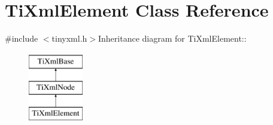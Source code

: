 \hypertarget{class_ti_xml_element}{
\section{TiXmlElement Class Reference}
\label{class_ti_xml_element}
}


{\ttfamily \#include $<$tinyxml.h$>$}Inheritance diagram for TiXmlElement::\begin{figure}[H]
\begin{center}
\leavevmode
\includegraphics[height=3cm]{class_ti_xml_element}
\end{center}
\end{figure}
